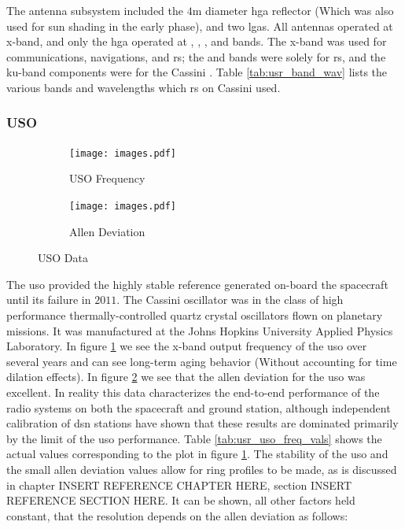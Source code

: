 \documentclass[oneside]{book}
\theoremstyle{mystyle}
\begin{document}
The antenna subsystem included the $4$m diameter \gls{hga} reflector (Which was also used for sun shading in the early  phase), and two \glspl{lga}. All antennas operated at \gls{x-band}, and only the \gls{hga} operated at , , , and  bands. The \gls{x-band} was used for communications, navigations, and \gls{rs}; the  and  bands were solely for \gls{rs}, and the \gls{ku-band} components were for the Cassini . Table \ref{tab:usr_band_wav} lists the various bands and wavelengths which \gls{rs} on Cassini used.

\subsubsection{\footnotesize USO \label{subsubsec:usr_USO}}

\begin{figure}[H]
	\centering
	\vspace{-1ex}
	\begin{subfigure}[b]{0.45\textwidth}
	    \texttt{[image: images.pdf]}
	    \caption{USO Frequency}
	    \label{fig:usr_uso_freq_plot_1}
    \end{subfigure}
    \begin{subfigure}[b]{0.49\textwidth}
        \texttt{[image: images.pdf]}
        \caption{\scriptsize Allen Deviation}
        \label{fig:usr_uso_allen_plot_1}
    \end{subfigure}
        \caption{USO Data}
        \label{fig:usr_uso_freq_allen_dev}
\end{figure}

The \gls{uso} provided the highly stable reference generated on-board the spacecraft until its failure in $2011$. The Cassini oscillator was in the class of high performance thermally-controlled quartz crystal oscillators flown on planetary missions. It was manufactured at the Johns Hopkins University Applied Physics Laboratory. In figure \ref{fig:usr_uso_freq_plot_1} we see the \gls{x-band} output frequency of the \gls{uso} over several years and can see long-term aging behavior (Without accounting for time dilation effects). In figure \ref{fig:usr_uso_allen_plot_1} we see that the \gls{allen deviation} for the \gls{uso} was excellent. In reality this data characterizes the end-to-end performance of the radio systems on both the spacecraft and ground station, although independent calibration of \gls{dsn} stations have shown that these results are dominated primarily by the limit of the \gls{uso} performance. Table \ref{tab:usr_uso_freq_vals} shows the actual values corresponding to the plot in figure \ref{fig:usr_uso_freq_plot_1}. The stability of the \gls{uso} and the small \gls{allen deviation} values allow for  ring profiles to be made, as is discussed in chapter INSERT REFERENCE CHAPTER HERE, section INSERT REFERENCE SECTION HERE. It can be shown, all other factors held constant, that the resolution depends on the \gls{allen deviation} as follows:
\end{document}
